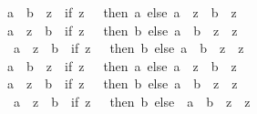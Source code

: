 \begin{isabellebody}
\ \ \ \ {\isachardoublequoteopen}a\ {\isacharplus}{\kern0pt}\ b\ {\isacharslash}{\kern0pt}\ z\ {\isacharequal}{\kern0pt}\ {\isacharparenleft}{\kern0pt}if\ z\ {\isacharequal}{\kern0pt}\ {}\ then\ a\ else\ {\isacharparenleft}{\kern0pt}a\ {\isacharasterisk}{\kern0pt}\ z\ {\isacharplus}{\kern0pt}\ b{\isacharparenright}{\kern0pt}\ {\isacharslash}{\kern0pt}\ z{\isacharparenright}{\kern0pt}{\isachardoublequoteclose}\isanewline
\ \ \ \ {\isachardoublequoteopen}a\ {\isacharslash}{\kern0pt}\ z\ {\isacharplus}{\kern0pt}\ b\ {\isacharequal}{\kern0pt}\ {\isacharparenleft}{\kern0pt}if\ z\ {\isacharequal}{\kern0pt}\ {}\ then\ b\ else\ {\isacharparenleft}{\kern0pt}a\ {\isacharplus}{\kern0pt}\ b\ {\isacharasterisk}{\kern0pt}\ z{\isacharparenright}{\kern0pt}\ {\isacharslash}{\kern0pt}\ z{\isacharparenright}{\kern0pt}{\isachardoublequoteclose}\isanewline
\ \ \ \ {\isachardoublequoteopen}{\isacharminus}{\kern0pt}\ {\isacharparenleft}{\kern0pt}a\ {\isacharslash}{\kern0pt}\ z{\isacharparenright}{\kern0pt}\ {\isacharplus}{\kern0pt}\ b\ {\isacharequal}{\kern0pt}\ {\isacharparenleft}{\kern0pt}if\ z\ {\isacharequal}{\kern0pt}\ {}\ then\ b\ else\ {\isacharparenleft}{\kern0pt}{\isacharminus}{\kern0pt}a\ {\isacharplus}{\kern0pt}\ b\ {\isacharasterisk}{\kern0pt}\ z{\isacharparenright}{\kern0pt}\ {\isacharslash}{\kern0pt}\ z{\isacharparenright}{\kern0pt}{\isachardoublequoteclose}\isanewline
\ \ \ \ {\isachardoublequoteopen}a\ {\isacharminus}{\kern0pt}\ b\ {\isacharslash}{\kern0pt}\ z\ {\isacharequal}{\kern0pt}\ {\isacharparenleft}{\kern0pt}if\ z\ {\isacharequal}{\kern0pt}\ {}\ then\ a\ else\ {\isacharparenleft}{\kern0pt}a\ {\isacharasterisk}{\kern0pt}\ z\ {\isacharminus}{\kern0pt}\ b{\isacharparenright}{\kern0pt}\ {\isacharslash}{\kern0pt}\ z{\isacharparenright}{\kern0pt}{\isachardoublequoteclose}\isanewline
\ \ \ \ {\isachardoublequoteopen}a\ {\isacharslash}{\kern0pt}\ z\ {\isacharminus}{\kern0pt}\ b\ {\isacharequal}{\kern0pt}\ {\isacharparenleft}{\kern0pt}if\ z\ {\isacharequal}{\kern0pt}\ {}\ then\ {\isacharminus}{\kern0pt}b\ else\ {\isacharparenleft}{\kern0pt}a\ {\isacharminus}{\kern0pt}\ b\ {\isacharasterisk}{\kern0pt}\ z{\isacharparenright}{\kern0pt}\ {\isacharslash}{\kern0pt}\ z{\isacharparenright}{\kern0pt}{\isachardoublequoteclose}\isanewline
\ \ \ \ {\isachardoublequoteopen}{\isacharminus}{\kern0pt}\ {\isacharparenleft}{\kern0pt}a\ {\isacharslash}{\kern0pt}\ z{\isacharparenright}{\kern0pt}\ {\isacharminus}{\kern0pt}\ b\ {\isacharequal}{\kern0pt}\ {\isacharparenleft}{\kern0pt}if\ z\ {\isacharequal}{\kern0pt}\ {}\ then\ {\isacharminus}{\kern0pt}b\ else\ {\isacharparenleft}{\kern0pt}{\isacharminus}{\kern0pt}\ a\ {\isacharminus}{\kern0pt}\ b\ {\isacharasterisk}{\kern0pt}\ z{\isacharparenright}{\kern0pt}\ {\isacharslash}{\kern0pt}\ z{\isacharparenright}{\kern0pt}{\isachardoublequoteclose}\isanewline

\end{isabellebody}
